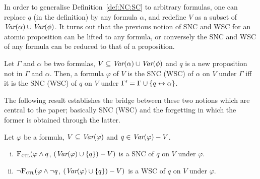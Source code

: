 \documentclass[letterpaper]{article} %
\begin{document}
In order to generalise Definition~\ref{def:NC:SC} to arbitrary formulas, one can replace $q$ (in the definition)  by any formula $\alpha$, and redefine  $V$ as a subset of $\textit{Var}(\alpha) \cup \textit{Var}(\phi)$.
    It turns out that the previous notion of SNC and WSC for an atomic proposition can be lifted to any formula, or conversely the SNC and WSC of any formula can be reduced to that of a proposition.
\begin{proposition}\label{formulaNS_to_p}
     Let $\Gamma$ and $\alpha$ be two formulas, $V \subseteq \textit{Var}(\alpha) \cup \textit{Var}(\phi)$  and $q$ is a new proposition not in $\Gamma$ and $\alpha$.
 Then, a formula $\varphi$ of $V$ is the SNC (WSC) of $\alpha$ on $V$ under  $\Gamma$ iff it is the SNC (WSC) of $q$ on $V$ under $\Gamma' = \Gamma \cup \{q \leftrightarrow \alpha\}$.
 \end{proposition}

The following result establishes the bridge between these two notions which are central to the paper; basically  SNC (WSC)  and the forgetting in which the former is obtained through the latter.




\begin{theorem}\label{thm:SNC:WSC:forget}
 Let $\varphi$ be a formula, $V\subseteq\textit{Var}(\varphi)$ and $q\in\textit{Var}(\varphi)- V$.
 \begin{enumerate}[(i)]
   \item ${\textsc{F}_{\textsc{ctl}}} (\varphi \land q$, $(\textit{Var}(\varphi) \cup \{q\}) - V)$
   is a SNC of $q$ on $V$ under $\varphi$.
   \item  $\neg{\textsc{F}_{\textsc{ctl}}} (\varphi \land \neg q$, $(\textit{Var}(\varphi) \cup \{q\}) - V)$
   is a WSC of $q$ on $V$ under $\varphi$.
 \end{enumerate}
 \end{theorem}
\end{document}
